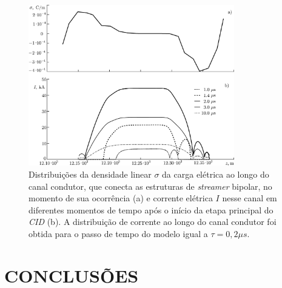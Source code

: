 \documentclass[a4paper, 12pt, onecolumn,singlespacing]{article}
\begin{document}
	\begin{figure}[!h]
		\centering
		\includegraphics[width=0.8\textwidth]{imagens/17.png}
		\caption{	Distribuições da densidade linear $\sigma$ da carga elétrica ao longo do canal condutor, que conecta as estruturas de \textit{streamer} bipolar, no momento de sua ocorrência (a) e corrente elétrica $I$ nesse canal em diferentes momentos de tempo após o início da etapa principal do \textit{CID} (b). A distribuição de corrente ao longo do canal condutor foi obtida para o passo de tempo do modelo igual a $\tau = 0,2 \mu s$.}
	\end{figure}
	\pagebreak
	\section{CONCLUSÕES}
	
\end{document}
